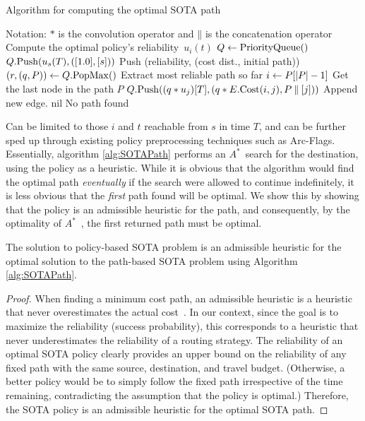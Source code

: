 \documentclass[oribibl]{llncs}
\DeclarePairedDelimiter{\p}{\lparen}{\rparen\nonscript\!\mathinner{}}
\DeclarePairedDelimiter{\abs}{\lvert}{\rvert}
\DeclarePairedDelimiter{\bk}{\lbrack}{\rbrack}
\newcommand{\concat}{\mathbin{\|}}
\begin{document}
			\begin{algorithm}[t]
				\caption{Algorithm for computing the optimal SOTA path}
				\label{alg:SOTAPath}
				\begin{algorithmic}
					\State Notation:
					 $\ast$ is the convolution operator and $\concat$ is the concatenation operator
						\State Compute the optimal policy's reliability\footnotemark~$u_i(t)$
					\EndFor
					\State $Q \gets \mathrm{PriorityQueue}(\null)$
					\State $Q.\mathrm{Push}\p*{u_s(T), \p*{\bk*{1.0}, \bk*{s}}}$
						\Comment Push (reliability, (cost dist., initial path))
						\State $(r, \p*{q, P}) \gets Q.\mathrm{PopMax}(\null)$
							\Comment Extract most reliable path so far
						\State $i \gets P\bk*{\abs{P} - 1}$
							\Comment Get the last node in the path
							\State \Return $P$
						\EndIf
							\State $Q.\mathrm{Push}\p*{\p*{q \ast u_j}\![T], \p*{q \ast E.\mathrm{Cost}(i, j), P \concat \bk*{j}}}$
								\Comment Append new edge.
						\EndFor
					\EndWhile
					\State \Return nil  \Comment No path found
				\end{algorithmic}
			\end{algorithm}
			\footnotetext
			{
				Can be limited to those $i$ and $t$ reachable from $s$ in time $T$,
				and can be further sped up through existing policy preprocessing techniques
				such as Arc-Flags.
			}
			Essentially, algorithm \ref{alg:SOTAPath} performs an $A^*$~search for the destination, using the policy
			as a heuristic.
			While it is obvious that the algorithm would find the optimal path \textit{eventually} if the search were
			allowed to continue indefinitely, it is less obvious that the \textit{first} path found will be optimal.
			We show this by showing that the policy is an admissible heuristic for the path,
			and consequently, by the optimality of $A^*$~\cite{dechter1985}, the first returned path must be optimal.

			\begin{proposition}[Admissibility]
				The solution to policy-based SOTA problem is an admissible heuristic for the
				optimal solution to the path-based SOTA problem using Algorithm \ref{alg:SOTAPath}.
			\end{proposition}
			\begin{proof}
				When finding a minimum cost path, an admissible heuristic is a heuristic that
				never overestimates the actual cost~\cite{russell1995}.
				In our context, since the goal is to maximize the reliability (success probability),
				this corresponds to a heuristic that never underestimates the reliability of a
				routing strategy. The reliability of an optimal SOTA policy clearly provides an upper bound
				on the reliability of any fixed path with the same source, destination, and travel budget.
				(Otherwise, a better policy would be to simply follow the fixed path irrespective of
				the time remaining, contradicting the assumption that the policy is optimal.)
				Therefore, the SOTA policy is an admissible heuristic for the optimal SOTA path.
			\end{proof}
\end{document}
